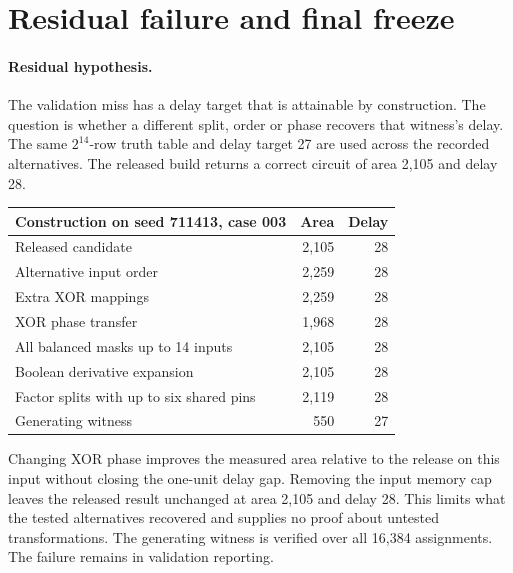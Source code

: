 \clearpage
\section*{Residual failure and final freeze}

\paragraph{Residual hypothesis.} The validation miss has a delay target that is attainable by construction. The question is whether a different split, order or phase recovers that witness's delay. The same \(2^{14}\)-row truth table and delay target 27 are used across the recorded alternatives. The released build returns a correct circuit of area 2,105 and delay 28.

\begin{center}
\small
\begin{tabular}{@{}lrr@{}}
\toprule
Construction on seed 711413, case 003 & Area & Delay\\
\midrule
Released candidate & 2,105 & 28\\
Alternative input order & 2,259 & 28\\
Extra XOR mappings & 2,259 & 28\\
XOR phase transfer & 1,968 & 28\\
All balanced masks up to 14 inputs & 2,105 & 28\\
Boolean derivative expansion & 2,105 & 28\\
Factor splits with up to six shared pins & 2,119 & 28\\
Generating witness & 550 & 27\\
\bottomrule
\end{tabular}
\end{center}

Changing XOR phase improves the measured area relative to the release on this input without closing the one-unit delay gap. Removing the input memory cap leaves the released result unchanged at area 2,105 and delay 28. This limits what the tested alternatives recovered and supplies no proof about untested transformations. The generating witness is verified over all 16,384 assignments. The failure remains in validation reporting.

